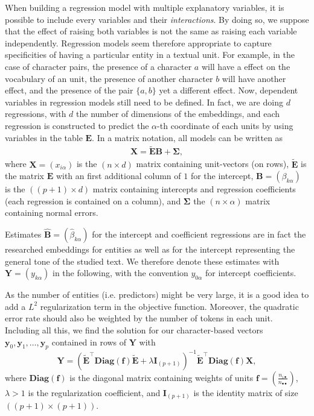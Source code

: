 \documentclass[
twocolumn,
]{ceurart}
\begin{document}
When building a regression model with multiple explanatory variables, it is possible to include every variables and their \emph{interactions}. By doing so, we suppose that the effect of raising both variables is not the same as raising each variable independently. Regression models seem therefore appropriate to capture specificities of having a particular entity in a textual unit. For example, in the case of character pairs, the presence of a character $a$ will have a effect on the vocabulary of an unit, the presence of another character $b$ will have another effect, and the presence of the pair $\{a, b\}$ yet a different effect. Now, dependent variables in regression models still need to be defined. In fact, we are doing $d$ regressions, with $d$ the number of dimensions of the embeddings, and each regression is constructed to predict the $\alpha$-th coordinate of each units by using variables in the table $\mathbf{E}$. In a matrix notation, all models can be written as
\begin{align}
\mathbf{X} = \widetilde{\mathbf{E}} \mathbf{B} + \bm{\Sigma}, \label{cent_sol}
\end{align}
where $\mathbf{X} = (x_{i\alpha})$ is the $(n \times d)$ matrix containing unit-vectors (on rows), $\widetilde{\mathbf{E}}$ is the matrix $\mathbf{E}$ with an first additional column of $1$ for the intercept, $\mathbf{B} = (\beta_{k\alpha})$ is the $((p+1) \times d)$ matrix containing intercepts and regression coefficients (each regression is contained on a column), and $\mathbf{\Sigma}$ the $(n \times \alpha)$ matrix containing normal errors. 

Estimates $\widehat{\mathbf{B}} = (\widehat{\beta}_{k\alpha})$ for the intercept and coefficient regressions are in fact the researched embeddings for entities as well as for the intercept representing the general tone of the studied text. We therefore denote these estimates with $\mathbf{Y} = (y_{k\alpha})$ in the following, with the convention $y_{0\alpha}$ for intercept coefficients. 

As the number of entities (i.e. predictors) might be very large, it is a good idea to add a $L^2$ regularization term in the objective function. Moreover, the quadratic error rate should also be weighted by the number of tokens in each unit. Including all this, we find the solution for our character-based vectors $\mathbf{y}_0, \mathbf{y}_1, \ldots, \mathbf{y}_p$ contained in rows of $\mathbf{Y}$ with 
\begin{equation}
\mathbf{Y} = (\widetilde{\mathbf{E}}^\top \textbf{Diag}(\mathbf{f}) \widetilde{\mathbf{E}} + \lambda \mathbf{I}_{(p+1)})^{-1} \widetilde{\mathbf{E}}^\top \textbf{Diag}(\mathbf{f}) \mathbf{X}, \label{reg_sol}
\end{equation}
where $\textbf{Diag}(\mathbf{f})$ is the diagonal matrix containing weights of units $\mathbf{f} = \left( \frac{n_{i \bullet}}{n_{\bullet \bullet}} \right)$, $\lambda > 1$ is the regularization coefficient, and $\mathbf{I}_{(p+1)}$ is the identity matrix of size $((p+1) \times (p+1))$.
\end{document}
